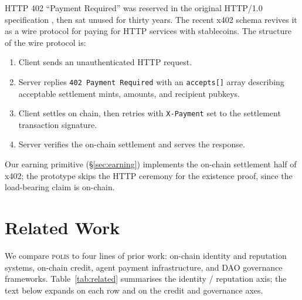 \documentclass[10pt,conference,letterpaper]{IEEEtran}
\theoremstyle{definition}
\newcommand{\polis}{\textsc{polis}\xspace}
\begin{document}
HTTP 402 ``Payment Required'' was reserved in the original HTTP/1.0
specification \cite{rfc7231}, then sat unused for thirty years. The
recent x402 schema \cite{x402spec} revives it as a wire protocol for
paying for HTTP services with stablecoins. The structure of the wire
protocol is:
\begin{enumerate}
\item Client sends an unauthenticated HTTP request.
\item Server replies \texttt{402 Payment Required} with an
\texttt{accepts[]} array describing acceptable settlement mints,
amounts, and recipient pubkeys.
\item Client settles on chain, then retries with \texttt{X-Payment} set
to the settlement transaction signature.
\item Server verifies the on-chain settlement and serves the response.
\end{enumerate}
Our earning primitive (\S\ref{sec:earning}) implements the on-chain
settlement half of x402; the prototype skips the HTTP ceremony for the
existence proof, since the load-bearing claim is on-chain.

\section{Related Work}\label{sec:related}

We compare \polis to four lines of prior work: on-chain identity and
reputation systems, on-chain credit, agent payment infrastructure, and
DAO governance frameworks. Table~\ref{tab:related} summarises the
identity / reputation axis; the text below expands on each row and on
the credit and governance axes.
\end{document}
